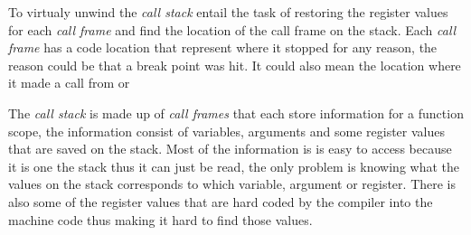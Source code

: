  


To virtualy unwind the \emph{call stack} entail the task of restoring the register values for each \emph{call frame} and find the location of the call frame on the stack.
Each \emph{call frame} has a code location that represent where it stopped for any reason, the reason could be that a break point was hit.
It could also mean the location where it made a call from or 


The \emph{call stack} is made up of \emph{call frames} that each store information for a function scope, the information consist of variables, arguments and some register values that are saved on the stack.
Most of the information is is easy to access because it is one the stack thus it can just be read, the only problem is knowing what the values on the stack corresponds to which variable, argument or register.
There is also some of the register values that are hard coded by the compiler into the machine code thus making it hard to find those values.

